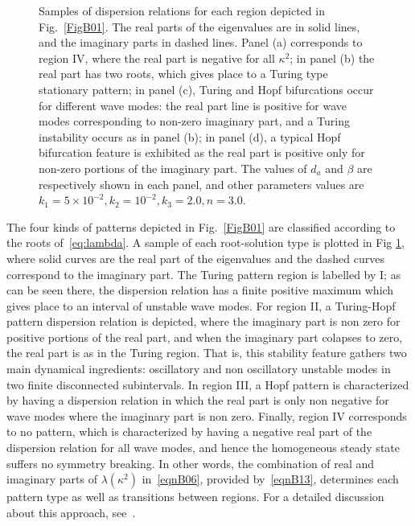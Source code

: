 \documentclass[%
 preprint,
 aip, 
 amsmath,amssymb,
]{revtex4-2}
\begin{document}
\begin{figure}[t!]
	\caption{Samples of dispersion relations for each region depicted in Fig.~\ref{FigB01}. The real parts of the eigenvalues are in solid lines, and the imaginary parts in dashed lines. Panel (a) corresponds to region IV, where the real part is negative for all $\kappa^2$; in panel (b) the real part has two roots, which gives place to a Turing type stationary pattern; in panel (c), Turing and Hopf bifurcations occur for different wave modes: the real part line is positive for wave modes corresponding to non-zero imaginary part, and a Turing instability occurs as in panel (b); in panel (d), a typical Hopf bifurcation feature is exhibited as the real part is positive only for non-zero portions of the imaginary part. The values of $d_a$ and $\beta$ are respectively shown in each panel, and other parameters values are $k_1=5\times10^{-2}, k_2=10^{-2}, k_3=2.0, n=3.0$.}
	\label{FigB02}
\end{figure}

The four kinds of patterns depicted in Fig.~\ref{FigB01} are classified according to the roots of~\eqref{eq:lambda}. A sample of each root-solution type is plotted in Fig \ref{FigB02}, where solid curves are the real part of the eigenvalues and the dashed curves correspond to the imaginary part. The Turing pattern region is labelled by I; as can be seen there, the dispersion relation has a finite positive maximum which gives place to an interval of unstable wave modes. For region II, a Turing-Hopf pattern dispersion relation is depicted, where the imaginary part is non zero for positive portions of the real part, and when the imaginary part colapses to zero, the real part is as in the Turing region. That is, this stability feature gathers two main dynamical ingredients: oscillatory and non oscillatory unstable modes in two finite disconnected subintervals. In region III, a Hopf pattern is characterized by having a dispersion relation in which the real part is only non negative for wave modes where the imaginary part is non zero. Finally, region IV corresponds to no pattern, which is characterized by having a negative real part of the dispersion relation for all wave modes, and hence the homogeneous steady state suffers no symmetry breaking. In other words, the combination of real and imaginary parts of $\lambda(\kappa^2)$ in~\eqref{eqnB06}, provided by~\eqref{eqnB13}, determines each pattern type as well as transitions between regions. For a detailed discussion about this approach, see~\cite{liu}.
\end{document}
